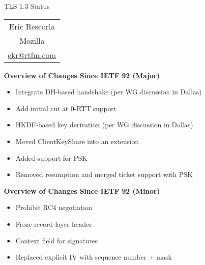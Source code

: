 \documentclass[helvetica]{seminar}
\newcommand{\heading}[1]{%
  \begin{center} 
    \large\bf 
    #1 
  \end{center} 
  \vspace{.4 in}}
\begin{document}
\begin{slide}
\begin{center}
\vspace{.5 in}
\LARGE{{\bf}TLS 1.3 Status}\\
\vspace{.2in}
\large{
\begin{tabular}{c}
Eric Rescorla\\
Mozilla\\
\url{ekr@rtfm.com}
\end{tabular}
}
\end{center}

\end{slide}

\centerslidesfalse 

\begin{slide}
\heading{Overview of Changes Since IETF 92 (Major)}

\begin{itemize}
\item Integrate DH-based handshake (per WG discussion in Dallas)
\item Add initial cut at 0-RTT support
\item HKDF-based key derivation (per WG discussion in Dallas)
\item Moved ClientKeyShare into an extension
\item Added support for PSK
\item Removed resumption and merged ticket support with PSK
\end{itemize}
\end{slide}

\begin{slide}
\heading{Overview of Changes Since IETF 92 (Minor)}

\begin{itemize}
\item Prohibit RC4 negotiation
\item Froze record-layer header
\item Context field for signatures
\item Replaced explicit IV with sequence number + mask
\end{itemize}
\end{slide}
\end{document}
